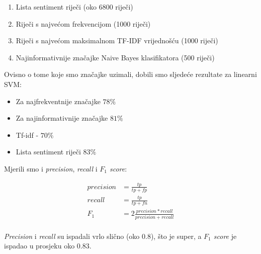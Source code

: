 \documentclass[conference]{IEEEtran}
\begin{document}
\begin{enumerate}
	\item Lista sentiment riječi (oko 6800 riječi)
	\item Riječi s najvećom frekvencijom (1000 riječi)
	\item Riječi s najvećom maksimalnom TF-IDF vrijednošću (1000 riječi)
	\item Najinformativnije značajke Naive Bayes klasifikatora (500 riječi)
\end{enumerate}



Ovisno o tome koje smo značajke uzimali, dobili smo sljedeće rezultate za linearni SVM:
\begin{itemize}
\item Za najfrekventnije značajke $78\%$
\item Za najinformativnije značajke $81\%$
\item Tf-idf - $70\%$
\item Lista sentiment riječi $83\%$
\end{itemize}

Mjerili smo i \textit{precision}, \textit{recall} i \textit{$F_1$ score}:

\begin{align*}
  precision &= \frac{tp}{tp + fp}                              \\
  recall    &= \frac{tp}{tp + fn}                              \\
  F_1       &= 2 \frac{precision * recall}{precision + recall} \\
\end{align*}

\textit{Precision} i \textit{recall} su ispadali vrlo slično (oko 0.8), što je
super, a \textit{$F_1$ score} je ispadao u prosjeku oko 0.83.
\end{document}
